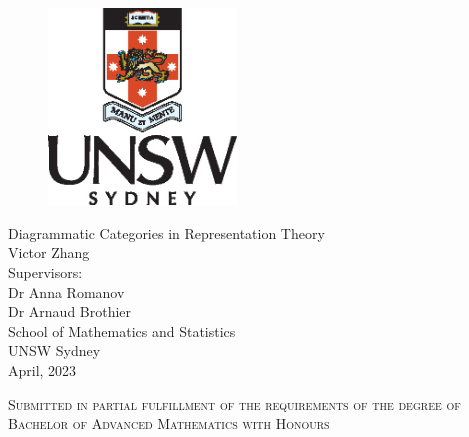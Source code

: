 \documentclass[12pt]{report}
\begin{document}
\thispagestyle{empty} %
\begin{figure} \begin{center}
    \includegraphics[width=5cm]{start-files/2022-01-portraitcolourpos.eps}
    \end{center} \end{figure}
\vspace*{\fill}
\begin{center}
    {\LARGE
    Diagrammatic Categories in Representation Theory\\
    }
    \vspace{4em}
    {\large
    Victor Zhang\\
    }
    \vspace{1.5em}
    {\large
    {\normalsize Supervisors:}\\Dr Anna Romanov\\Dr Arnaud Brothier\\
    }
    \vspace{2em}
    School of Mathematics and Statistics\\UNSW Sydney
    \\ \vspace{3em}
    April, 2023
\end{center}
\vspace*{\fill}
\begin{center}
    \small\textsc{Submitted in partial fulfillment of the
    requirements of the degree of \\
    Bachelor of Advanced Mathematics with Honours}
\end{center}



\tableofcontents
\thispagestyle{empty}
\clearpage
\setcounter{page}{1}








\renewcommand{\bibname}{References}
\printbibliography[heading=bibintoc]
\end{document}
